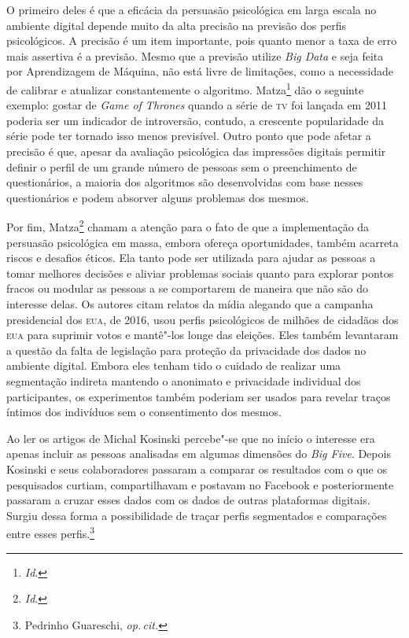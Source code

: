 O primeiro deles é que a eficácia da persuasão psicológica em larga
escala no ambiente digital depende muito da alta precisão na previsão
dos perfis psicológicos. A precisão é um item importante, pois quanto
menor a taxa de erro mais assertiva é a previsão. Mesmo que a previsão
utilize \textit{Big Data} e seja feita por Aprendizagem de Máquina, não
está livre de limitações, como a necessidade de calibrar e atualizar
constantemente o algoritmo. Matza\footnote{\textit{Id}.} dão o seguinte exemplo:
gostar de \textit{Game of Thrones} quando a série de \textsc{tv} foi lançada em
2011 poderia ser um indicador de introversão, contudo, a crescente
popularidade da série pode ter tornado isso menos previsível. Outro
ponto que pode afetar a precisão é que, apesar da avaliação psicológica
das impressões digitais permitir definir o perfil de um grande número de
pessoas sem o preenchimento de questionários, a maioria dos algoritmos
são desenvolvidas com base nesses questionários e podem absorver alguns
problemas dos mesmos.

Por fim, Matza\footnote{\textit{Id}.} chamam a atenção para o fato de que a
implementação da persuasão psicológica em massa, embora ofereça
oportunidades, também acarreta riscos e desafios éticos. Ela tanto pode
ser utilizada para ajudar as pessoas a tomar melhores decisões e aliviar
problemas sociais quanto para explorar pontos fracos ou modular as
pessoas a se comportarem de maneira que não são do interesse delas. Os
autores citam relatos da mídia alegando que a campanha presidencial dos
\textsc{eua}, de 2016, usou perfis psicológicos de milhões de cidadãos dos \textsc{eua}
para suprimir votos e mantê"-los longe das eleições. Eles também
levantaram a questão da falta de legislação para proteção da privacidade
dos dados no ambiente digital. Embora eles tenham tido o cuidado de
realizar uma segmentação indireta mantendo o anonimato e privacidade
individual dos participantes, os experimentos também poderiam ser usados
para revelar traços íntimos dos indivíduos sem o consentimento dos
mesmos.

Ao ler os artigos de Michal Kosinski percebe"-se que no início o
interesse era apenas incluir as pessoas analisadas em algumas dimensões
do \textit{Big Five}. Depois Kosinski e seus colaboradores passaram a
comparar os resultados com o que os pesquisados curtiam, compartilhavam
e postavam no Facebook e posteriormente passaram a cruzar esses dados
com os dados de outras plataformas digitais. Surgiu dessa forma a
possibilidade de traçar perfis segmentados e comparações entre esses
perfis.\footnote{Pedrinho Guareschi, \textit{op.\,cit.}}

